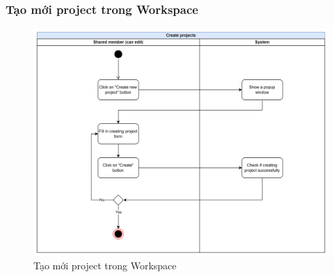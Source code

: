 \subsubsection{Tạo mới project trong Workspace}
    \begin{figure}[H]
        \centering
        \includegraphics[width=\linewidth]{Content/Phân tích và thiết kế hệ thống/documents/Sơ đồ hoạt động/images/createProjects.png}
        \vspace{0.5cm}
        \caption{Tạo mới project trong Workspace}
        \label{fig:Tạo mới project trong Workspace}
    \end{figure}